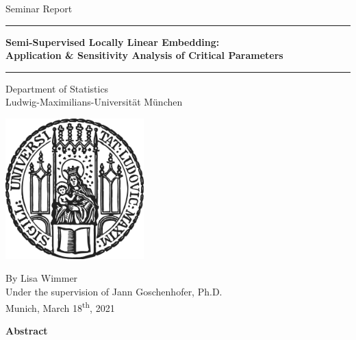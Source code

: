 \documentclass[12pt, t]{article}
\begin{document}


 
\begin{titlepage}
\begin{center}
    
\Large
Seminar Report
    
\vspace{1cm}
      
\rule{\textwidth}{1.5pt}
\Large 
\textbf{Semi-Supervised Locally Linear Embedding: \\ Application \& Sensitivity 
Analysis of Critical Parameters}
\rule{\textwidth}{1.5pt}
   
\vspace{1cm}
      
\large
Department of Statistics \\
Ludwig-Maximilians-Universität München
      
\vspace{3.5cm}

\includegraphics[width = 0.4\textwidth]{figures/sigillum.png}

\vspace{3.5cm}

\large
By Lisa Wimmer \\
Under the supervision of Jann Goschenhofer, Ph.D. \\
Munich, March 18\textsuperscript{th}, 2021

\end{center}
\end{titlepage}


\newpage

\Large
\noindent
\textbf{Abstract}
\vspace{0.5cm} \\
\noindent
\normalsize

\newpage
\end{document}

